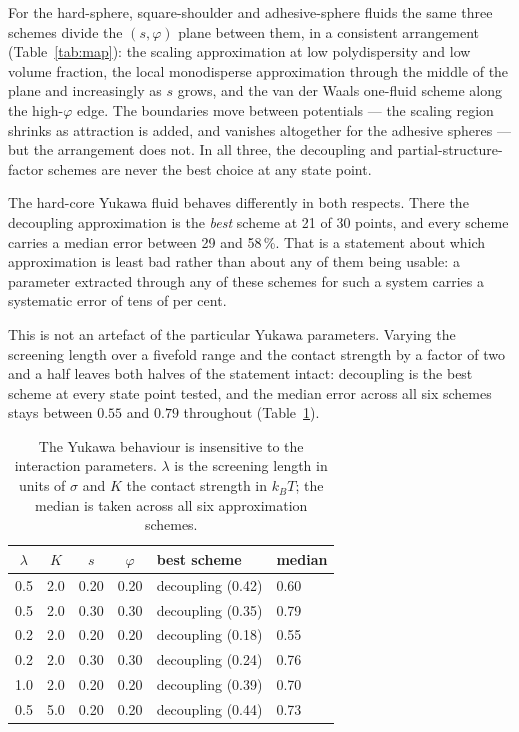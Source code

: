 For the hard-sphere, square-shoulder and adhesive-sphere fluids the same three
schemes divide the $(s,\varphi)$ plane between them, in a consistent
arrangement (Table~\ref{tab:map}): the scaling approximation at low
polydispersity and low volume fraction, the local monodisperse approximation
through the middle of the plane and increasingly as $s$ grows, and the van der
Waals one-fluid scheme along the high-$\varphi$ edge. The boundaries move
between potentials --- the scaling region shrinks as attraction is added, and
vanishes altogether for the adhesive spheres --- but the arrangement does not.
In all three, the decoupling and partial-structure-factor schemes are never
the best choice at any state point.

The hard-core Yukawa fluid behaves differently in both respects. There the
decoupling approximation is the \emph{best} scheme at 21 of 30 points, and
every scheme carries a median error between 29 and 58\,\%. That is a statement
about which approximation is least bad rather than about any of them being
usable: a parameter extracted through any of these schemes for such a system
carries a systematic error of tens of per cent.

This is not an artefact of the particular Yukawa parameters. Varying the
screening length over a fivefold range and the contact strength by a factor
of two and a half leaves both halves of the statement intact: decoupling is
the best scheme at every state point tested, and the median error across all
six schemes stays between $0.55$ and $0.79$ throughout
(Table~\ref{tab:yukawa}).

\begin{table}[htbp]
\centering
\caption{The Yukawa behaviour is insensitive to the interaction parameters.
$\lambda$ is the screening length in units of $\sigma$ and $K$ the contact
strength in $k_BT$; the median is taken across all six approximation schemes.}
\label{tab:yukawa}
\small
\begin{tabular}{ccccll}
\toprule
$\lambda$ & $K$ & $s$ & $\varphi$ & best scheme & median\\
\midrule
0.5 & 2.0 & 0.20 & 0.20 & decoupling (0.42) & 0.60\\
0.5 & 2.0 & 0.30 & 0.30 & decoupling (0.35) & 0.79\\
0.2 & 2.0 & 0.20 & 0.20 & decoupling (0.18) & 0.55\\
0.2 & 2.0 & 0.30 & 0.30 & decoupling (0.24) & 0.76\\
1.0 & 2.0 & 0.20 & 0.20 & decoupling (0.39) & 0.70\\
0.5 & 5.0 & 0.20 & 0.20 & decoupling (0.44) & 0.73\\
\bottomrule
\end{tabular}
\end{table}

